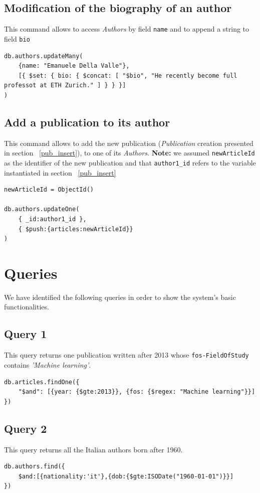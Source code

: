 \documentclass{Configuration_Files/PoliMi3i_thesis}
\begin{document}
\subsection{Modification of the biography of an author}
This command allows to access \emph{Authors} by field \verb |name| and to append a string to field \verb |bio|
\begin{lstlisting}
db.authors.updateMany(
	{name: "Emanuele Della Valle"},
	[{ $set: { bio: { $concat: [ "$bio", "He recently become full professot at ETH Zurich." ] } } }]
)
\end{lstlisting}

\subsection{Add a publication to its author}
This command allows to add the new publication (\emph{Publication} creation presented in section ~\ref{pub_insert}), to
one of its \emph{Authors}. \newline
\textbf{Note:} we assumed \verb |newArticleId| as the identifier of the new publication and that \verb |author1_id|
refers to the variable instantiated in section ~\ref{pub_insert}
\begin{lstlisting}
newArticleId = ObjectId()

db.authors.updateOne(
	{ _id:author1_id },
	{ $push:{articles:newArticleId}}
)
\end{lstlisting}


\newpage
\section{Queries}
We have identified the following queries in order to show the system's basic functionalities.

\subsection{Query 1}
This query returns one publication written after 2013 whose \verb |fos-FieldOfStudy| contains \emph{'Machine learning'}.
\begin{lstlisting}
db.articles.findOne({
	"$and": [{year: {$gte:2013}}, {fos: {$regex: "Machine learning"}}]
})
\end{lstlisting}

\subsection{Query 2}
This query returns all the Italian authors born after 1960.
\begin{lstlisting}
db.authors.find({
	$and:[{nationality:'it'},{dob:{$gte:ISODate("1960-01-01")}}]
})
\end{lstlisting}
\end{document}
